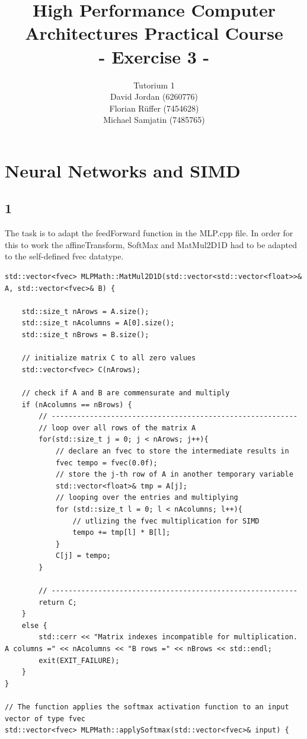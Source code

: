 \documentclass{article}
\title{\textbf{High Performance Computer Architectures Practical Course \\ - Exercise 3 -} \\[10mm]}
\author{Tutorium 1 \\[10mm] David Jordan (6260776) \\[1mm] Florian Rüffer (7454628) \\[1mm] Michael Samjatin (7485765) \\[10mm]}
\begin{document}
\maketitle
\newpage
\section{Neural Networks and SIMD}
\subsection*{1}
The task is to adapt the feedForward function in the MLP.cpp file. In order for this to work the affineTransform, SoftMax and MatMul2D1D had to be adapted to the self-defined fvec datatype. \\
\begin{lstlisting}[caption=SIMDed math functions]
std::vector<fvec> MLPMath::MatMul2D1D(std::vector<std::vector<float>>& A, std::vector<fvec>& B) {

    std::size_t nArows = A.size();
    std::size_t nAcolumns = A[0].size();
    std::size_t nBrows = B.size();

    // initialize matrix C to all zero values
    std::vector<fvec> C(nArows);

    // check if A and B are commensurate and multiply
    if (nAcolumns == nBrows) {
        // ----------------------------------------------------------
        // loop over all rows of the matrix A
        for(std::size_t j = 0; j < nArows; j++){
            // declare an fvec to store the intermediate results in
            fvec tempo = fvec(0.0f);
            // store the j-th row of A in another temporary variable
            std::vector<float>& tmp = A[j];
            // looping over the entries and multiplying
            for (std::size_t l = 0; l < nAcolumns; l++){
                // utlizing the fvec multiplication for SIMD
                tempo += tmp[l] * B[l];
            }
            C[j] = tempo;
        }
        
        // ----------------------------------------------------------
        return C;
    }
    else {
        std::cerr << "Matrix indexes incompatible for multiplication. A columns =" << nAcolumns << "B rows =" << nBrows << std::endl;
        exit(EXIT_FAILURE);
    }
}

// The function applies the softmax activation function to an input vector of type fvec
std::vector<fvec> MLPMath::applySoftmax(std::vector<fvec>& input) {


\end{lstlisting}
\end{document}
